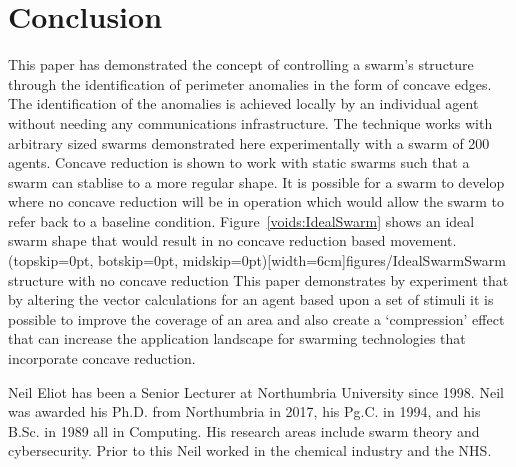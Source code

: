 \documentclass{ieeeaccess}
\begin{document}
\section{Conclusion}\label{voids:Conclusion}
This paper has demonstrated the concept of controlling a swarm's structure through the identification of perimeter anomalies in the form of concave edges. The identification of the anomalies is achieved locally by an individual agent without needing any communications infrastructure. The technique works with arbitrary sized swarms demonstrated here experimentally with a swarm of 200 agents.
Concave reduction is shown to work with static swarms such that a swarm can stablise to a more regular shape. It is possible for a swarm to develop where no concave reduction will be in operation which would allow the swarm to refer back to a baseline condition. Figure~\ref{voids:IdealSwarm} shows an ideal swarm shape that would result in no concave reduction based movement. 
\Figure[t!](topskip=0pt, botskip=0pt, midskip=0pt)[width=6cm]{figures/IdealSwarm}{Swarm structure with no concave reduction\label{voids:IdealSwarm}}
This paper demonstrates by experiment that by altering the vector calculations for an agent based upon a set of stimuli it is possible to improve the coverage of an area and also create a `compression' effect that can increase the application landscape for swarming technologies that incorporate concave reduction.


\newpage

\begin{IEEEbiography}{Neil Eliot}
has been a Senior Lecturer at Northumbria University since 1998.  Neil was awarded his Ph.D. from Northumbria in 2017, his Pg.C. in 1994, and his B.Sc. in 1989 all in Computing. His research areas include swarm theory and cybersecurity. Prior to this Neil worked in the chemical industry and the NHS. 
\end{IEEEbiography}
\end{document}

